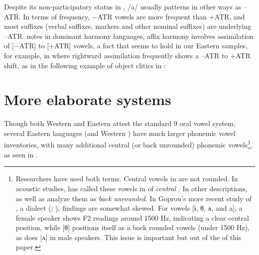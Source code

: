 \documentclass[output=paper,newtxmath,modfonts,nonflat,draft]{langsci/langscibook}
\begin{document}
Despite its non-participatory status in , /a/ usually patterns in other ways as –ATR. In terms of frequency, −ATR vowels are more frequent than +ATR, and most suffixes (verbal suffixes,  markers and other nominal suffixes) are underlying –ATR. \citet{Casali2008} notes in dominant harmony languages, affix harmony involves assimilation of [$-$ATR] to [+ATR] vowels, a fact that seems to hold in our Eastern  samples, for example, in  where rightward assimilation frequently shows a –ATR to +ATR shift, as in the following example of object clitics in :


\ea
    \label{ex:zogbo:3}
		 \citep{Marchese1975}
    \z






\section{More elaborate systems}\label{sec:zogbo:2} 

Though both Western and Eastern  attest the standard 9 oral vowel system, several Eastern  languages (and Western ) have much larger phonemic vowel inventories, with many additional central (or back unrounded) phonemic vowels\footnote{Researchers have used both terms.  Central vowels in  are not rounded. In acoustic studies, \citet{grégoire1972} has called these vowels in  of  \textit{central} \citep[see also][15]{Zogbo1981}. In other descriptions, \citet[61]{Werle1976} as well as \citet[7]{kipre2005} analyze them as \textit{back unrounded.} In Goprou’s more recent study of , a  dialect (\citeyear{Goprou2010}; \citeyear[177]{Goprou2014}), findings are somewhat skewed. For vowels [ɨ, θ, ʌ, and a], a female speaker shows F2 readings around 1500 Hz, indicating a clear central position, while [θ] positions itself as a back rounded vowels (under 1500 Hz), as does [ʌ] in male speakers. This issue is important but out of the  of this paper.}, as seen in .
\end{document}
